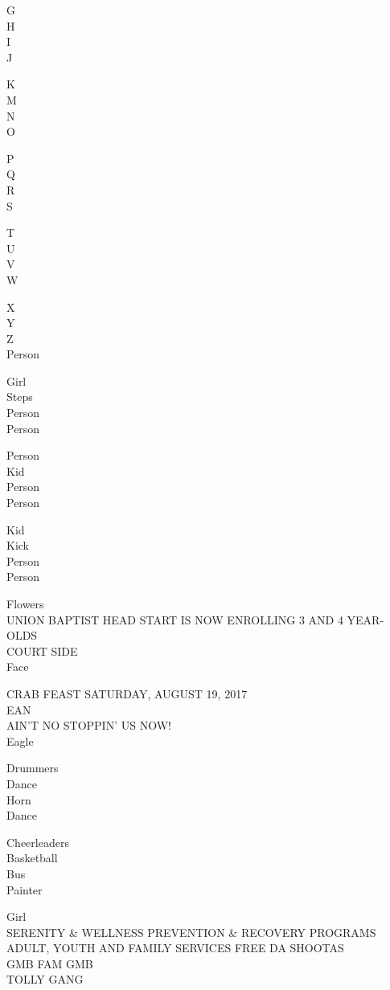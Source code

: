 \documentclass[10pt,letterpaper]{article}
\begin{document}
G\\
H\\
I\\
J

K\\
M\\
N\\
O

P\\
Q\\
R\\
S

T\\
U\\
V\\
W

X\\
Y\\
Z\\
Person

Girl\\
Steps\\
Person\\
Person

Person\\
Kid\\
Person\\
Person

Kid\\
Kick\\
Person\\
Person

Flowers\\
UNION BAPTIST HEAD START IS NOW ENROLLING 3 AND 4 YEAR{-}OLDS\\
COURT SIDE\\
Face

CRAB FEAST SATURDAY, AUGUST 19, 2017\\
EAN\\
AIN'T NO STOPPIN' US NOW!\\
Eagle

Drummers\\
Dance\\
Horn\\
Dance

Cheerleaders\\
Basketball\\
Bus\\
Painter

Girl\\
SERENITY \& WELLNESS PREVENTION \& RECOVERY PROGRAMS ADULT, YOUTH AND FAMILY SERVICES FREE DA SHOOTAS\\
GMB FAM GMB\\
TOLLY GANG
\end{document}
